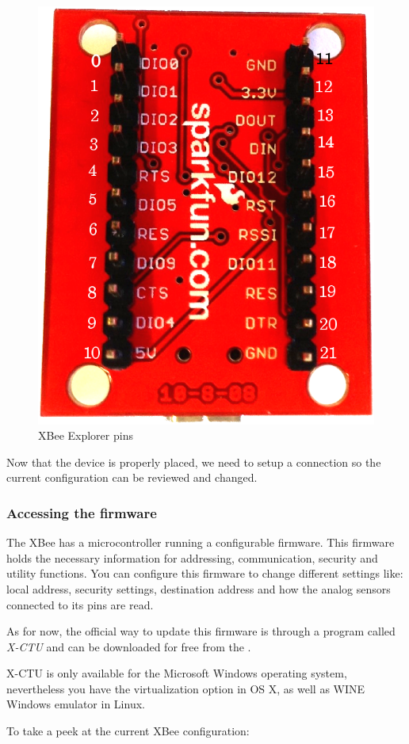 \begin{figure}[htbp]
  \centering
  \includegraphics[width=0.6\linewidth]{figures/xbeeBreakoutBoardPins.eps}
  \caption{XBee Explorer pins
  \label{fig:xbeeBreakoutBoardPins}}
\end{figure}

Now that the device is properly placed, we need to setup a connection so the current configuration can be reviewed and changed.

\subsubsection{Accessing the firmware}\label{xbeeRoleConfiguration}

The XBee has a microcontroller running a configurable firmware. This firmware holds the necessary information for addressing, communication, security and utility functions. You can configure this firmware to change different settings like: local address, security settings, destination address and how the analog sensors connected to its pins are read.

As for now, the official way to update this firmware is through a program called \emph{X-CTU} and can be downloaded for free from the \emph{}.

X-CTU is only available for the Microsoft Windows operating system, nevertheless you have the virtualization option in OS X, as well as WINE Windows emulator in Linux. 

To take a peek at the current XBee configuration: 


